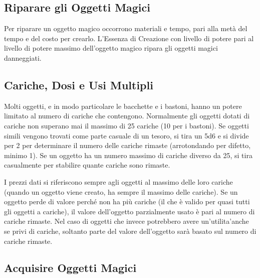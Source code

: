 \documentclass[a4paper,11pt,twoside,openany]{book}
\begin{document}
\subsection{Riparare gli Oggetti Magici}
\label{riparare-gli-oggetti-magici}

Per riparare un oggetto magico occorrono materiali e tempo, pari alla metà del tempo e del costo per crearlo. L'Essenza di Creazione con livello di potere pari al livello di potere massimo dell'oggetto magico ripara gli oggetti magici danneggiati.


\subsection{Cariche, Dosi e Usi Multipli}

\label{cariche-dosi-e-usi-multipli}

Molti oggetti, e in modo particolare le bacchette e i bastoni, hanno un potere limitato al numero di cariche che contengono. Normalmente gli oggetti dotati di cariche non superano mai il massimo di 25 cariche (10 per i bastoni). Se oggetti simili vengono trovati come parte casuale di un tesoro, si tira un 5d6 e si divide per 2 per determinare il numero delle cariche rimaste (arrotondando per difetto, minimo 1). Se un oggetto ha un numero massimo di cariche diverso da 25, si tira casualmente per stabilire quante cariche sono rimaste.

I prezzi dati si riferiscono sempre agli oggetti al massimo delle loro cariche (quando un oggetto viene creato, ha sempre il massimo delle cariche). Se un oggetto perde di valore perché non ha più cariche (il che è valido per quasi tutti gli oggetti a cariche), il valore dell'oggetto parzialmente usato è pari al numero di cariche rimaste. Nel caso di oggetti che invece potrebbero avere un'utilita'anche se privi di cariche, soltanto parte del valore dell'oggetto sarà basato sul numero di cariche rimaste.


\subsection{Acquisire Oggetti Magici}

\label{acquisire-oggetti-magici}

\bigskip
\end{document}
